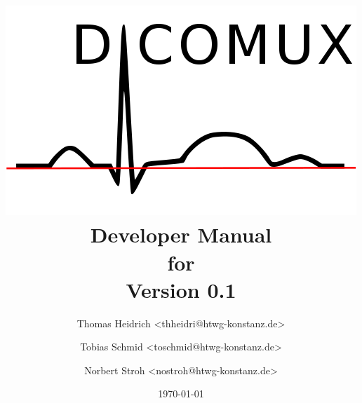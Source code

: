 %
%

\begin{titlepage}
\title{
	\centering
	\includegraphics[scale=0.8]{screens/logo_big.png}
	\medskip
	Developer Manual\\
	for\\
	Version 0.1
}

\author {
Thomas Heidrich <thheidri@htwg-konstanz.de> \and
Tobias Schmid <toschmid@htwg-konstanz.de> \and
Norbert Stroh <nostroh@htwg-konstanz.de>
}
\date{\today}
\maketitle
\end{titlepage}

%
%